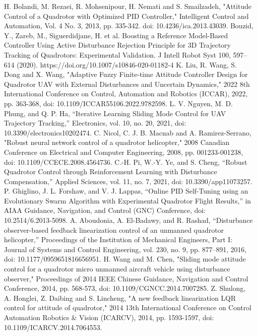 \documentclass[conference]{IEEEtran}
\begin{document}
\begin{thebibliography}{00}
 H. Bolandi, M. Rezaei, R. Mohsenipour, H. Nemati and S. Smailzadeh, "Attitude Control of a Quadrotor with Optimized PID Controller," Intelligent Control and Automation, Vol. 4 No. 3, 2013, pp. 335-342. doi: 10.4236/ica.2013.43039.
 Bouzid, Y., Zareb, M., Siguerdidjane, H. et al. Boosting a Reference Model-Based Controller Using Active Disturbance Rejection Principle for 3D Trajectory Tracking of Quadrotors: Experimental Validation. J Intell Robot Syst 100, 597–614 (2020). https://doi.org/10.1007/s10846-020-01182-4
 K. Liu, R. Wang, S. Dong and X. Wang, "Adaptive Fuzzy Finite-time Attitude Controller Design for Quadrotor UAV with External Disturbances and Uncertain Dynamics," 2022 8th International Conference on Control, Automation and Robotics (ICCAR), 2022, pp. 363-368, doi: 10.1109/ICCAR55106.2022.9782598.
 L. V. Nguyen, M. D. Phung, and Q. P. Ha, “Iterative Learning Sliding Mode Control for UAV Trajectory Tracking,” Electronics, vol. 10, no. 20, 2021, doi: 10.3390/electronics10202474.
 C. Nicol, C. J. B. Macnab and A. Ramirez-Serrano, "Robust neural network control of a quadrotor helicopter," 2008 Canadian Conference on Electrical and Computer Engineering, 2008, pp. 001233-001238, doi: 10.1109/CCECE.2008.4564736.
 C.-H. Pi, W.-Y. Ye, and S. Cheng, “Robust Quadrotor Control through Reinforcement Learning with Disturbance Compensation,” Applied Sciences, vol. 11, no. 7, 2021, doi: 10.3390/app11073257.
 P. Ghiglino, J. L. Forshaw, and V. J. Lappas, “Online PID Self-Tuning using an Evolutionary Swarm Algorithm with Experimental Quadrotor Flight Results,” in AIAA Guidance, Navigation, and Control (GNC) Conference, doi: 10.2514/6.2013-5098.
 A. Aboudonia, A. El-Badawy, and R. Rashad, “Disturbance observer-based feedback linearization control of an unmanned quadrotor helicopter,” Proceedings of the Institution of Mechanical Engineers, Part I: Journal of Systems and Control Engineering, vol. 230, no. 9, pp. 877–891, 2016, doi: 10.1177/0959651816656951.
 H. Wang and M. Chen, "Sliding mode attitude control for a quadrotor micro unmanned aircraft vehicle using disturbance observer," Proceedings of 2014 IEEE Chinese Guidance, Navigation and Control Conference, 2014, pp. 568-573, doi: 10.1109/CGNCC.2014.7007285.
 Z. Shulong, A. Honglei, Z. Daibing and S. Lincheng, "A new feedback linearization LQR control for attitude of quadrotor," 2014 13th International Conference on Control Automation Robotics \& Vision (ICARCV), 2014, pp. 1593-1597, doi: 10.1109/ICARCV.2014.7064553.

\end{thebibliography}
\end{document}
